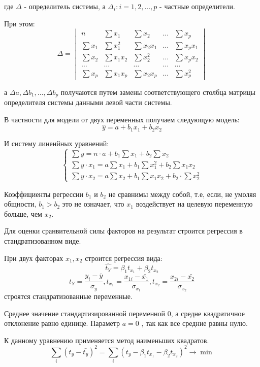 \documentclass[aps,%
12pt,%
final,%
oneside,
onecolumn,%
musixtex, %
superscriptaddress,%
centertags]{article} %
\begin{document}
где $\Delta$ - определитель системы, а $\Delta_i:  i ={1,2,...,p}$ - частные определители.

При этом:
$$\Delta = 
\begin{vmatrix}
n & \sum x_1 & \sum x_2 & \ldots & \sum x_p \\[0.3cm]
\sum x_1 & \sum x_1^2 & \sum x_2x_1 & \ldots & \sum x_px_1 \\[0.3cm]
\sum x_2 & \sum x_1x_2& \sum x_2^2 & \ldots & \sum x_p x_2 \\[0.3cm]
\ldots & \ldots & \ldots & \ldots & \ldots \\[0.3cm]
\sum x_p & \sum x_1x_p & \sum x_2x_p & \ldots & \sum x_p^2
\end{vmatrix}$$

а $\Delta a, \Delta b_1, \ldots , \Delta b_p$ получаются путем замены соответствующего столбца матрицы определителя системы данными левой части системы.

В частности для модели от двух переменных получаем следующую модель:
$$ \widehat{y} = a +b_1x_1 + b_2x_2$$

И систему линенйных уравнений:
$$\left \{
\begin{matrix}
	\sum y = n \cdot a + b_1 \sum x_1 + b_2 \sum x_2 \\[0.3cm]
	\sum y \cdot x_1 = a \sum x_1 + b_1 \sum x_1^2 + b_2 \sum x_1x_2\\[0.3cm]
	\sum y \cdot x_2 = a\sum x_2 + b_1 \sum x_1x_2 + b_2 \cdot \sum x_2^2
\end{matrix}
\right.
$$

Коэффициенты регрессии $b_1$ и $b_2$ не сравнимы между собой, т.е, если, не умоляя общности, $b_1>b_2$ это не означает, что $x_1$ воздействует на целевую переменную больше, чем $x_2$.

Для оценки сранвительной силы факторов на результат строится регрессия в стандратизованном виде. 

При двух факторах $x_1,x_2$ строится регрессия вида:
$$ \hat{t_Y} = \beta_1t_{x_1} + \beta_2t_{x_2} $$
$$t_{Y} = \frac{y_i-\bar{y}}{\sigma_y}, t_{x_1} = \frac{x_{1i}-\bar{x_1}}{\sigma_{x_1}}, t_{x_2} = \frac{x_{2i}-\bar{x_2}}{\sigma_{x_2}}$$
строятся стандратизованные переменные. 

Среднее значение стандартизированной переменной 0, а средне квадратичное отклонение равно единице. Параметр $a=0$ , так как все средние равны нулю. 

К данному уравнению применяется метод наименьших квадратов.
$$ \sum_{i} (t_{y} - \bar{t_y})^2 = \sum_i (t_y - \beta_1t_{x_1} - \beta_2 t_{x_2})^2 \to \min $$
\end{document}
